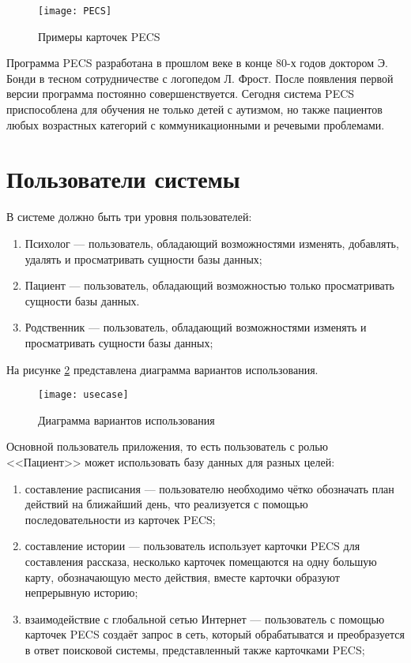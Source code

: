 \begin{figure}[ht!]\centering
	\texttt{[image: PECS]}
	\caption{Примеры карточек PECS}
	\label{PECScards}
\end{figure}

Программа PECS разработана в прошлом веке в конце 80-х годов доктором Э. Бонди в тесном сотрудничестве с логопедом Л. Фрост. После появления первой версии программа постоянно совершенствуется. Сегодня система PECS приспособлена для обучения не только детей с аутизмом, но также пациентов любых возрастных категорий с коммуникационными и речевыми проблемами.

\section{Пользователи системы}

В системе должно быть три уровня пользователей:
\begin{enumerate}[label=\arabic*.]
	\item Психолог --- пользователь, обладающий возможностями изменять, добавлять, удалять и просматривать сущности базы данных;
	\item Пациент --- пользователь, обладающий возможностью только просматривать сущности базы данных.
	\item Родственник --- пользователь, обладающий возможностями изменять и просматривать сущности базы данных;
\end{enumerate}

На рисунке \ref{users} представлена диаграмма вариантов использования.

\begin{figure}[ht!]\centering
	\texttt{[image: usecase]}
	\caption{Диаграмма вариантов использования}
	\label{users}
\end{figure}

\pagebreak

Основной пользователь приложения, то есть пользователь с ролью <<Пациент>> может использовать базу данных для разных целей:
\begin{enumerate}[label=\arabic*.]
	\item составление расписания --- пользователю необходимо чётко обозначать план действий на ближайший день, что реализуется с помощью последовательности из карточек PECS;
	\item составление истории --- пользователь использует карточки PECS для составления рассказа, несколько карточек помещаются на одну большую карту, обозначающую место действия, вместе карточки образуют непрерывную историю;
	\item взаимодействие с глобальной сетью Интернет --- пользователь с помощью карточек PECS создаёт запрос в сеть, который обрабатыватся и преобразуется в ответ поисковой системы, представленный также карточками PECS;
\end{enumerate}



